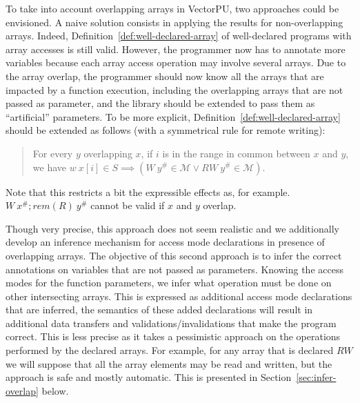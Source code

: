 \documentclass[preprint,12pt]{elsarticle}
\newcommand{\symb}[1]{\textit{#1}}
\newcommand{\rem}[1]{\symb{rem}(#1)}
\newcommand{\abs}[1]{#1^\#}
\newcommand{\AM}{\mathcal{M}}
\begin{document}
To take into account overlapping arrays in VectorPU, two approaches could be envisioned. A naive solution consists in applying the results for non-overlapping arrays. Indeed, Definition~\ref{def:well-declared-array} of well-declared programs with array accesses is still valid. However,  the programmer now has to annotate more variables because each array access operation may involve several arrays. Due to the array overlap, the programmer should now know all the arrays that are impacted by a function execution, including the overlapping arrays that are not passed as parameter, and the library should be extended to pass them as ``artificial'' parameters. To be more explicit, Definition~\ref{def:well-declared-array} should be extended as follows (with a symmetrical rule for remote writing):

\begin{quote}
For every $y$ overlapping $x$, if $i$ is in the range in common between $x$ and $y$, we have $w\ x[i]\in S \implies (W\ \abs y \in \AM \lor RW\ \abs y \in \AM)$.
\end{quote}

Note that this restricts a bit the expressible effects as, for example. $W\ \abs x ; \rem{R}\ \abs y$ cannot be valid if $x$ and $y$ overlap.


\medskip

Though very precise, this approach does not seem realistic and we additionally develop an inference mechanism for access mode declarations in presence of overlapping arrays.
The objective of this second approach is to infer the correct annotations on  variables that are not passed as parameters. Knowing the access modes for the function parameters, we infer what operation must be done on other intersecting arrays. This is expressed as additional access mode declarations that are inferred, the semantics of these added declarations will result in additional data transfers and validations/invalidations that make the program correct. This is less precise as it takes a pessimistic approach on the operations performed by the declared arrays. For example, for any array that is declared $RW$ we will suppose that all the array elements may be read and written, but the approach is safe and mostly automatic. This is presented in Section~\ref{sec:infer-overlap} below.
%
\end{document}
